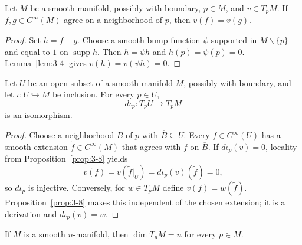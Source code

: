 \begin{proposition}
\label{prop:3-8}





Let $M$ be a smooth manifold, possibly with boundary, $p\in M$, and
$v\in T_pM$. If $f,g\in C^\infty(M)$ agree on a neighborhood of $p$, then
$v(f)=v(g)$.
\end{proposition}

\begin{proof}

\sketch
Set $h=f-g$. Choose a smooth bump function $\psi$ supported in
$M\smallsetminus\{p\}$ and equal to $1$ on $\operatorname{supp}h$. Then
$h=\psi h$ and $h(p)=\psi(p)=0$. Lemma~\ref{lem:3-4} gives $v(h)=v(\psi h)=0$.
\end{proof}

\begin{proposition}
\label{prop:3-9}





Let $U$ be an open subset of a smooth manifold $M$, possibly with boundary,
and let $\iota:U\hookrightarrow M$ be inclusion. For every $p\in U$,
\[
d\iota_p:T_pU\longrightarrow T_pM
\]
is an isomorphism.
\end{proposition}

\begin{proof}

\sketch
Choose a neighborhood $B$ of $p$ with $\overline B\subseteq U$. Every
$f\in C^\infty(U)$ has a smooth extension $\widetilde f\in C^\infty(M)$ that
agrees with $f$ on $\overline B$. If $d\iota_p(v)=0$, locality from
Proposition~\ref{prop:3-8} yields
\[
v(f)=v(\widetilde f|_U)=d\iota_p(v)(\widetilde f)=0,
\]
so $d\iota_p$ is injective. Conversely, for $w\in T_pM$ define
$v(f)=w(\widetilde f)$. Proposition~\ref{prop:3-8} makes this independent of the chosen
extension; it is a derivation and $d\iota_p(v)=w$.
\end{proof}

\begin{proposition}
\label{prop:3-10}





If $M$ is a smooth $n$-manifold, then $\dim T_pM=n$ for every $p\in M$.
\end{proposition}

